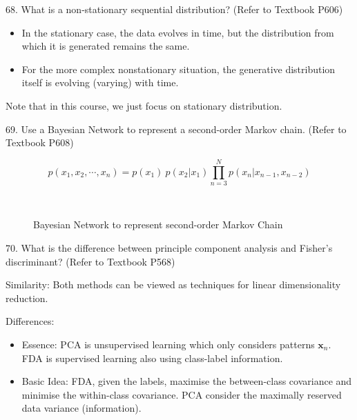 \documentclass[11pt,a4paper]{article}
\newcommand{\bs}[1]{\boldsymbol{#1}}
\begin{document}
68. What is a non-stationary sequential distribution? (Refer to Textbook P606)

\begin{itemize}
     \item In the stationary case, the data evolves in time, but the distribution from which it is generated remains the same.
     \item For the more complex nonstationary situation, the generative distribution itself is evolving (varying) with time. 
    \end{itemize}

Note that in this course, we just focus on stationary distribution.

69. Use a Bayesian Network to represent a second-order Markov chain. (Refer to Textbook P608)

$$ p(x_1, x_2, \cdots, x_n) = p(x_1) \ p(x_2 | x_1) \prod_{n=3}^{N} p(x_n | x_{n-1}, x_{n-2}) $$
\begin{figure}[H] \centering
{}\\[0.5cm]
\caption{Bayesian Network to represent second-order Markov Chain}
\end{figure}

70. What is the difference between principle component analysis and Fisher's discriminant? (Refer to Textbook P568)

    Similarity: Both methods can be viewed as techniques for linear dimensionality reduction.
    
    Differences:
    \begin{itemize}
        \item Essence: PCA is unsupervised learning which only considers patterns $\bs{x}_n$. FDA is supervised learning also using class-label information.
    \item Basic Idea: FDA, given the labels, maximise the between-class covariance and minimise the within-class covariance. PCA consider the maximally reserved data variance (information).
     \end{itemize}
\end{document}
